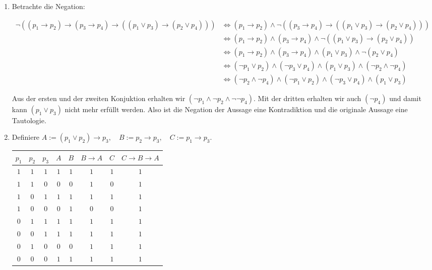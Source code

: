 \begin{solution}

\phantom{}

\begin{enumerate}[label = \alph*.]

  \item Betrachte die Negation:

  \begin{align*}
    \neg ((p_1 \to p_2) \to (p_3 \to p_4) \to ((p_1 \lor p_3) \to (p_2 \lor p_4))) &\iff
    (p_1 \to p_2) \land \neg ((p_3 \to p_4) \to ((p_1 \lor p_3) \to (p_2 \lor p_4))) \\
    &\iff (p_1 \to p_2) \land (p_3 \to p_4) \land \neg ((p_1 \lor p_3) \to (p_2 \lor p_4)) \\
    &\iff (p_1 \to p_2) \land (p_3 \to p_4) \land (p_1 \lor p_3) \land \neg (p_2 \lor p_4) \\
    &\iff (\neg p_1 \lor p_2) \land (\neg p_3 \lor p_4) \land (p_1 \lor p_3) \land (\neg p_2 \land \neg p_4) \\
    &\iff (\neg p_2 \land \neg p_4) \land (\neg p_1 \lor p_2) \land (\neg p_3 \lor p_4) \land (p_1 \lor p_3)
  \end{align*}

  Aus der ersten und der zweiten Konjuktion erhalten wir $(\neg p_1 \land \neg p_2 \land \neg \neg p_4)$.
  Mit der dritten erhalten wir auch $(\neg p_4)$ und damit kann $(p_1 \lor p_3)$ nicht mehr erfüllt werden.
  Also ist die Negation der Aussage eine Kontradiktion und die originale Aussage eine Tautologie.

  \item Definiere $A := (p_1 \lor p_2) \to p_3, \quad B := p_2 \to p_3, \quad C:= p_1 \to p_3$. \\

  \begin{tabular}{|c|c|c|c|c|c|c|c|}
    \hline
    $p_1$ & $p_2$ & $p_3$ & $A$ & $B$ & $B \to A$
    & $C$ & $C \to B \to A$\\
    \hline
    $1$ & $1$ & $1$ & $1$ & $1$ & $1$ & $1$ & $1$\\
    \hline
    $1$ & $1$ & $0$ & $0$ & $0$ & $1$ & $0$ & $1$\\
    \hline
    $1$ & $0$ & $1$ & $1$ & $1$ & $1$ & $1$ & $1$\\
    \hline
    $1$ & $0$ & $0$ & $0$ & $1$ & $0$ & $0$ & $1$\\
    \hline
    $0$ & $1$ & $1$ & $1$ & $1$ & $1$ & $1$ & $1$\\
    \hline
    $0$ & $0$ & $1$ & $1$ & $1$ & $1$ & $1$ & $1$\\
    \hline
    $0$ & $1$ & $0$ & $0$ & $0$ & $1$ & $1$ & $1$\\
    \hline
    $0$ & $0$ & $0$ & $1$ & $1$ & $1$ & $1$ & $1$\\
    \hline
  \end{tabular} \\


\end{enumerate}
\end{solution}
